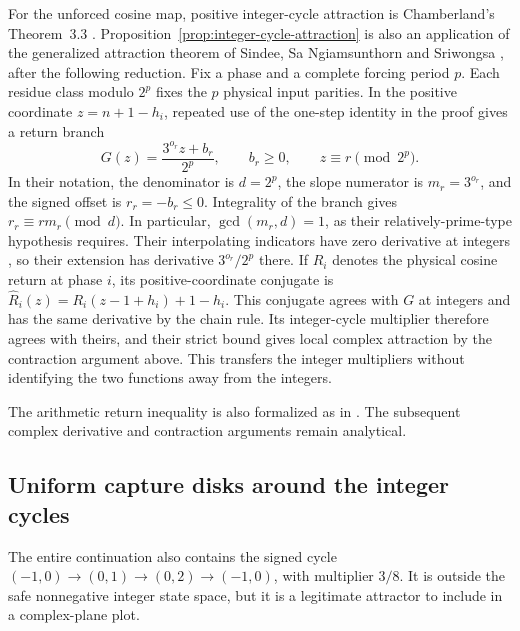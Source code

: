 For the unforced cosine map, positive integer-cycle attraction is
Chamberland's Theorem~3.3 \cite{chamberland-1996}.
Proposition~\ref{prop:integer-cycle-attraction} is also an application
of the generalized attraction theorem of Sindee, Sa Ngiamsunthorn
and Sriwongsa \cite[Theorem~3.3]{sindee-2024}, after the following
reduction. Fix a phase and a complete forcing period $p$. Each
residue class modulo $2^p$ fixes the $p$ physical input parities.
In the positive coordinate $z=n+1-h_i$, repeated use of the
one-step identity in the proof gives a return branch
\[
 G(z)=\frac{3^{o_r}z+b_r}{2^p},\qquad b_r\ge0,
 \qquad z\equiv r\pmod{2^p}.
\]
In their notation, the denominator is $d=2^p$, the slope numerator
is $m_r=3^{o_r}$, and the signed offset is $r_r=-b_r\le0$.
Integrality of the branch gives $r_r\equiv r m_r\pmod d$.
In particular, $\gcd(m_r,d)=1$, as their relatively-prime-type
hypothesis requires. Their interpolating indicators have zero
derivative at integers \cite[Lemma~2.2]{sindee-2024}, so their
extension has derivative $3^{o_r}/2^p$ there. If $R_i$ denotes the
physical cosine return at phase $i$, its positive-coordinate conjugate
is $\widehat R_i(z)=R_i(z-1+h_i)+1-h_i$. This conjugate agrees
with $G$ at integers and has the same derivative by the chain rule. Its integer-cycle
multiplier therefore agrees with theirs, and their strict bound
gives local complex attraction by the contraction argument above.
This transfers the integer multipliers without identifying the
two functions away from the integers.

The arithmetic return inequality is also formalized as
 in
. The subsequent
complex derivative and contraction arguments remain analytical.

\subsection{Uniform capture disks around the integer cycles}

The entire continuation also contains the signed cycle
$(-1,0)\to(0,1)\to(0,2)\to(-1,0)$, with multiplier $3/8$.
It is outside the safe nonnegative integer state space, but it is a
legitimate attractor to include in a complex-plane plot.

